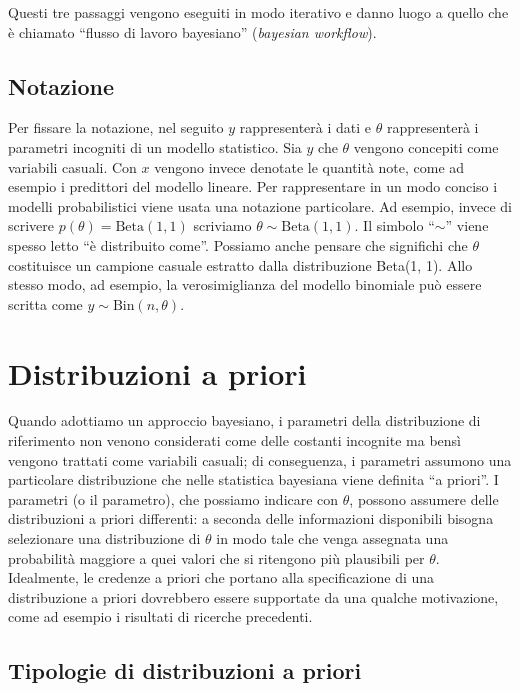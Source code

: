 \documentclass[
  11pt,
]{krantz}
\theoremstyle{definition}
\theoremstyle{definition}
\theoremstyle{definition}
\theoremstyle{definition}
\theoremstyle{remark}
\begin{document}
Questi tre passaggi vengono eseguiti in modo iterativo e danno luogo a quello che è chiamato ``flusso di lavoro bayesiano'' (\emph{bayesian workflow}).

\hypertarget{notazione}{%
\subsection{Notazione}\label{notazione}}

Per fissare la notazione, nel seguito \(y\) rappresenterà i dati e \(\theta\) rappresenterà i parametri incogniti di un modello statistico. Sia \(y\) che \(\theta\) vengono concepiti come variabili casuali. Con \(x\) vengono invece denotate le quantità note, come ad esempio i predittori del modello lineare. Per rappresentare in un modo conciso i modelli probabilistici viene usata una notazione particolare. Ad esempio, invece di scrivere \(p(\theta) = \mbox{Beta}(1, 1)\) scriviamo \(\theta \sim \mbox{Beta}(1, 1)\). Il simbolo ``\(\sim\)'' viene spesso letto ``è distribuito come''. Possiamo anche pensare che significhi che \(\theta\) costituisce un campione casuale estratto dalla distribuzione Beta(1, 1). Allo stesso modo, ad esempio, la verosimiglianza del modello binomiale può essere scritta come \(y \sim \text{Bin}(n, \theta)\).

\hypertarget{distribuzioni-a-priori}{%
\section{Distribuzioni a priori}\label{distribuzioni-a-priori}}

Quando adottiamo un approccio bayesiano, i parametri della distribuzione di riferimento non venono considerati come delle costanti incognite ma bensì vengono trattati come variabili casuali; di conseguenza, i parametri assumono una particolare distribuzione che nelle statistica bayesiana viene definita ``a priori''. I parametri (o il parametro), che possiamo indicare con \(\theta\), possono assumere delle distribuzioni a priori differenti: a seconda delle informazioni disponibili bisogna selezionare una distribuzione di \(\theta\) in modo tale che venga assegnata una probabilità maggiore a quei valori che si ritengono più plausibili per \(\theta\). Idealmente, le credenze a priori che portano alla specificazione di una distribuzione a priori dovrebbero essere supportate da una qualche motivazione, come ad esempio i risultati di ricerche precedenti.

\hypertarget{tipologie-di-distribuzioni-a-priori}{%
\subsection{Tipologie di distribuzioni a priori}\label{tipologie-di-distribuzioni-a-priori}}
\end{document}
